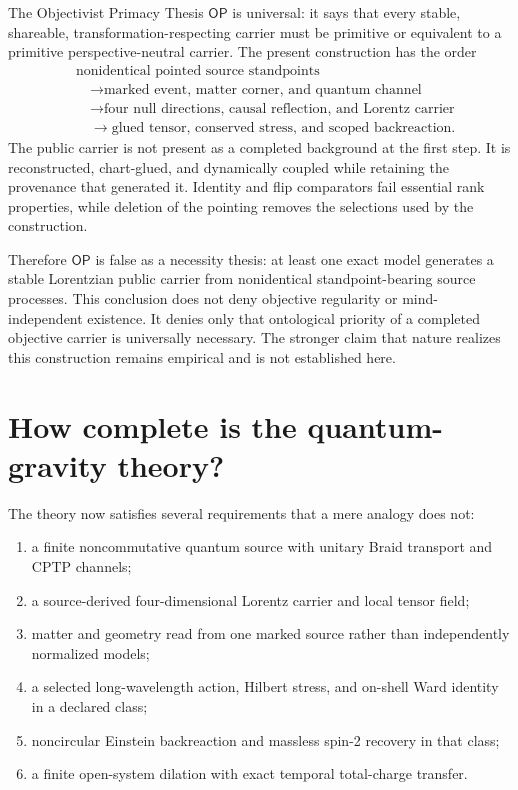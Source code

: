 \documentclass[11pt]{article}
\theoremstyle{definition}
\theoremstyle{remark}
\newcommand{\OPT}{\mathsf{OP}}
\begin{document}
The Objectivist Primacy Thesis $\OPT$ is universal: it says that every stable, shareable, transformation-respecting carrier must be primitive or equivalent to a primitive perspective-neutral carrier. The present construction has the order
\begin{equation}
 \begin{aligned}
 &\text{nonidentical pointed source standpoints}\\
 &\quad\longrightarrow\text{marked event, matter corner, and quantum channel}\\
 &\quad\longrightarrow\text{four null directions, causal reflection, and Lorentz carrier}\\
 &\quad\longrightarrow\text{glued tensor, conserved stress, and scoped backreaction}.
 \end{aligned}
\end{equation}
The public carrier is not present as a completed background at the first step. It is reconstructed, chart-glued, and dynamically coupled while retaining the provenance that generated it. Identity and flip comparators fail essential rank properties, while deletion of the pointing removes the selections used by the construction.

Therefore $\OPT$ is false as a necessity thesis: at least one exact model generates a stable Lorentzian public carrier from nonidentical standpoint-bearing source processes. This conclusion does not deny objective regularity or mind-independent existence. It denies only that ontological priority of a completed objective carrier is universally necessary. The stronger claim that nature realizes this construction remains empirical and is not established here.

\section{How complete is the quantum-gravity theory?}

The theory now satisfies several requirements that a mere analogy does not:
\begin{enumerate}
\item a finite noncommutative quantum source with unitary Braid transport and CPTP channels;
\item a source-derived four-dimensional Lorentz carrier and local tensor field;
\item matter and geometry read from one marked source rather than independently normalized models;
\item a selected long-wavelength action, Hilbert stress, and on-shell Ward identity in a declared class;
\item noncircular Einstein backreaction and massless spin-2 recovery in that class;
\item a finite open-system dilation with exact temporal total-charge transfer.
\end{enumerate}
\end{document}
